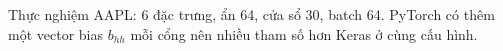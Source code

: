 Thực nghiệm AAPL: 6 đặc trưng, ẩn 64, cửa sổ 30, batch 64. PyTorch có thêm một vector bias $b_{hh}$ mỗi cổng nên nhiều tham số hơn Keras ở cùng cấu hình.
